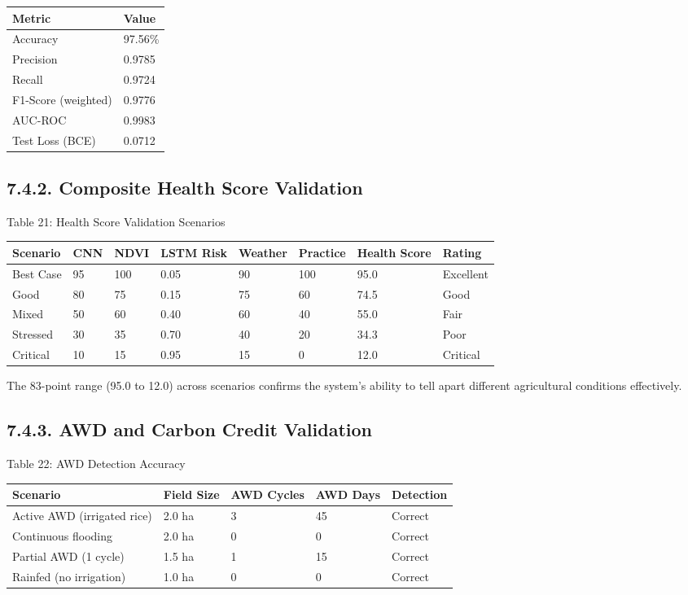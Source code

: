 \documentclass[12pt, a4paper]{report}
\begin{document}
\begin{table}[htbp]
\centering
\small
\begin{tabularx}{\textwidth}{|X|X|}
\hline
Metric & Value \\
\hline
Accuracy & 97.56\% \\
Precision & 0.9785 \\
Recall & 0.9724 \\
F1-Score (weighted) & 0.9776 \\
AUC-ROC & 0.9983 \\
Test Loss (BCE) & 0.0712 \\
\hline
\end{tabularx}
\end{table}

\subsection{7.4.2. Composite Health Score Validation}
Table 21: Health Score Validation Scenarios

\begin{table}[htbp]
\centering
\small
\begin{tabularx}{\textwidth}{|X|X|X|X|X|X|X|X|}
\hline
Scenario & CNN & NDVI & LSTM Risk & Weather & Practice & Health Score & Rating \\
\hline
Best Case & 95 & 100 & 0.05 & 90 & 100 & 95.0 & Excellent \\
Good & 80 & 75 & 0.15 & 75 & 60 & 74.5 & Good \\
Mixed & 50 & 60 & 0.40 & 60 & 40 & 55.0 & Fair \\
Stressed & 30 & 35 & 0.70 & 40 & 20 & 34.3 & Poor \\
Critical & 10 & 15 & 0.95 & 15 & 0 & 12.0 & Critical \\
\hline
\end{tabularx}
\end{table}

The 83-point range (95.0 to 12.0) across scenarios confirms the system's ability to tell apart different agricultural conditions effectively.

\subsection{7.4.3. AWD and Carbon Credit Validation}
Table 22: AWD Detection Accuracy

\begin{table}[htbp]
\centering
\small
\begin{tabularx}{\textwidth}{|X|X|X|X|X|}
\hline
Scenario & Field Size & AWD Cycles & AWD Days & Detection \\
\hline
Active AWD (irrigated rice) & 2.0 ha & 3 & 45 & Correct \\
Continuous flooding & 2.0 ha & 0 & 0 & Correct \\
Partial AWD (1 cycle) & 1.5 ha & 1 & 15 & Correct \\
Rainfed (no irrigation) & 1.0 ha & 0 & 0 & Correct \\
\hline
\end{tabularx}
\end{table}
\end{document}
